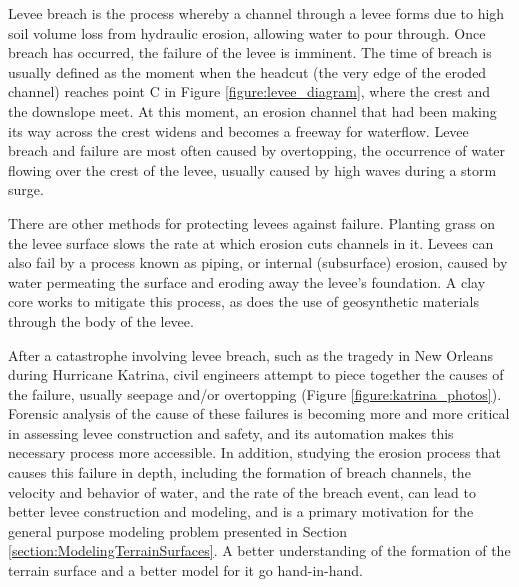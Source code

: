 Levee breach is the process whereby a channel through a levee forms due to high soil volume loss from hydraulic erosion, allowing water to pour through. Once breach has occurred, the failure of the levee is imminent. The time of breach is usually defined as the moment when the headcut (the very edge of the eroded channel) reaches point C in Figure \ref{figure:levee_diagram}, where the crest and the downslope meet. At this moment, an erosion channel that had been making its way across the crest widens and becomes a freeway for waterflow.
Levee breach and failure are most often caused by overtopping, the occurrence of water flowing over the crest of the levee, usually caused by high waves during a storm surge.

There are other methods for protecting levees against failure. Planting grass on the levee surface slows the rate at which erosion cuts channels in it. Levees can also fail by a process known as piping, or internal (subsurface) erosion, caused by water permeating the surface and eroding away the levee's foundation. A clay core works to mitigate this process, as does the use of geosynthetic materials through the body of the levee.

After a
catastrophe involving levee breach, such as the tragedy in New Orleans
during Hurricane Katrina, civil engineers attempt to piece together
the causes of the failure, usually seepage and/or
overtopping \cite{SENATE_REPORT} (Figure \ref{figure:katrina_photos}). 
% 
% 
Forensic analysis of the cause of these failures is becoming more and more critical in assessing levee construction and safety, and its automation
makes this necessary process
more accessible.
% 
In addition, studying the erosion process that causes this failure in depth, including the formation of breach channels, the velocity and behavior of water, and the rate of the breach event, can lead to better levee construction and modeling, and is a primary motivation for the general purpose modeling problem presented in Section \ref{section:ModelingTerrainSurfaces}. A better understanding of the formation of the terrain surface and a better model for it go hand-in-hand.


